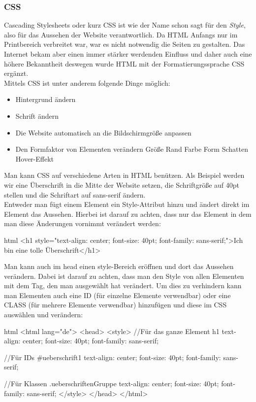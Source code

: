 		\subsubsection{CSS}
		Cascading Stylesheets oder kurz CSS ist wie der Name schon sagt für den \textit{Style}, also für das Aussehen der Website verantwortlich. Da HTML Anfangs nur im Printbereich verbreitet war, war es nicht notwendig die Seiten zu gestalten. Das Internet bekam aber einen immer stärker werdenden Einfluss und daher auch eine höhere Bekanntheit deswegen wurde HTML mit der Formatierungssprache CSS ergänzt.\\
		Mittels CSS ist unter anderem folgende Dinge möglich:
		\begin{itemize}
			\item Hintergrund ändern
			\item Schrift ändern
			\item Die Website automatisch an die Bildschirmgröße anpassen
			\item Den Formfaktor von Elementen verändern
			\subitem Größe
			\subitem Rand
			\subitem Farbe
			\subitem Form
			\subitem Schatten
			\subitem Hover-Effekt
		\end{itemize}
		Man kann CSS auf verschiedene Arten in HTML benützen. Als Beispiel werden wir eine Überschrift in die Mitte der Website setzen, die Schriftgröße auf 40pt stellen und die Schriftart auf sans-serif ändern.\\
		Entweder man fügt einem Element ein Style-Attribut hinzu und ändert direkt im Element das Aussehen. Hierbei ist darauf zu achten, dass nur das Element in dem man diese Änderungen vornimmt verändert werden:
		\begin{code}{html}
			<h1 style="text-align: center; font-size: 40pt; font-family: sans-serif;">Ich bin eine tolle Überschrift</h1>
		\end{code}
		Man kann auch im head einen style-Bereich eröffnen und dort das Aussehen verändern. Dabei ist darauf zu achten, dass man den Style von allen Elementen mit dem Tag, den man ausgewählt hat verändert. Um dies zu verhindern kann man Elementen auch eine ID (für einzelne Elemente verwendbar) oder eine CLASS (für mehrere Elemente verwendbar) hinzufügen und diese im CSS auswählen und verändern:
		\begin{code}{html}
			<html lang="de">
				<head>
					<style>
					//Für das ganze Element
					h1 {
						text-align: center; 
						font-size: 40pt; 
						font-family: sans-serif;
					}
				
					//Für IDs
					#ueberschrift1 {
						text-align: center; 
						font-size: 40pt; 
						font-family: sans-serif;
					}
					
					//Für Klassen
					.ueberschriftenGruppe {
						text-align: center; 
						font-size: 40pt; 
						font-family: sans-serif;
					}
					</style>
				</head>
			</html>
		\end{code}
